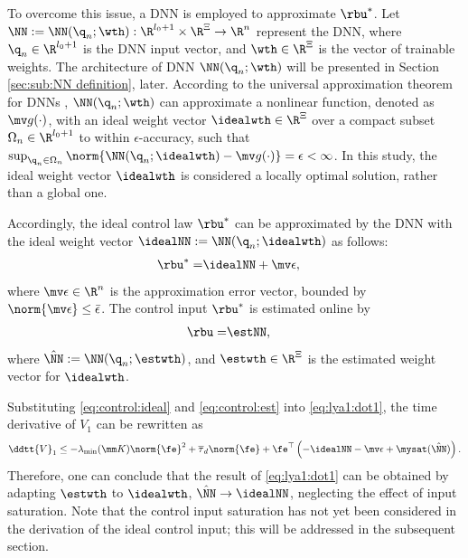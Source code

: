 \documentclass[journal]{IEEEtran}
\begin{document}
To overcome this issue, a DNN is employed to approximate $\rbu^*$.
Let $\NN:=\NN({\q}_n;\wth): \R^{l_0+1}\times\R^{\Xi}\to\R^{n}$ represent the DNN, where ${\q}_n\in\R^{l_0+1}$ is the DNN input vector, and $\wth\in\R^{\Xi}$ is the vector of trainable weights.
The architecture of DNN $\NN({\q}_n;\wth)$ will be presented in Section \ref{sec:sub:NN definition}, later.
According to the universal approximation theorem for DNNs \cite{Kidger:2020aa}, $\NN({\q}_n;\wth)$ can approximate a nonlinear function, denoted as $\mv g(\cdot)$, with an ideal weight vector $\idealwth\in\R^\Xi$ over a compact subset $\Omega_{n}\in\R^{l_0+1}$ to within $\epsilon$-accuracy, such that $\sup_{{\q}_n\in\Omega_{n}}\norm{ \NN({\q}_n;\idealwth) - \mv g(\cdot)} = \epsilon < \infty$.
In this study, the ideal weight vector $\idealwth$ is considered a locally optimal solution, rather than a global one.

Accordingly, the ideal control law $\rbu^*$ can be approximated by the DNN with the ideal weight vector $\idealNN:=\NN({\q}_n;\idealwth)$ as follows:
\begin{align}
    \rbu^*=& \idealNN+\mv\epsilon
    ,
    \label{eq:control:ideal}
\end{align}
where $\mv\epsilon\in\R^n$ is the approximation error vector, bounded by $\norm{\mv\epsilon}\le \bar{\epsilon}$.
The control input $\rbu^*$ is estimated online by
\begin{align}
    \rbu =& \estNN,
    \label{eq:control:est}
\end{align}
where $\hat\NN:=\NN({\q}_n;\estwth)$, and $\estwth\in\R^\Xi$ is the estimated weight vector for $\idealwth$.

Substituting \eqref{eq:control:ideal} and \eqref{eq:control:est} into \eqref{eq:lya1:dot1}, the time derivative of $V_1$ can be rewritten as
\begin{equation}
    \ddtt{V}_1
    \le 
    -\lambda_{\min}(\mm K)\norm{\fe}^2
    +
    \overline\tau_d\norm{\fe}
    +
    \fe^\top 
    \left(
        -\idealNN
        -\mv\epsilon
        +\mysat(\hat\NN)
    \right)
    .
    \label{eq:lya1:dot2}
\end{equation}
Therefore, one can conclude that the result of \eqref{eq:lya1:dot1} can be obtained by adapting $\estwth$ to $\idealwth$, \ie $\hat\NN\to\idealNN$, neglecting the effect of input saturation.
Note that the control input saturation has not yet been considered in the derivation of the ideal control input; this will be addressed in the subsequent section.
\end{document}
